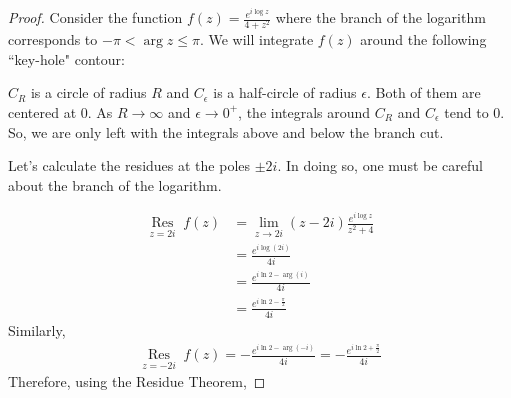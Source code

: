 \begin{proof}
Consider the function $f(z) = \frac{e^{i\log z}}{4+z^2}$ where the branch of the logarithm corresponds to $-\pi < \arg z \leq \pi$. We will integrate $f(z)$ around the following ``key-hole" contour:
\begin{figure}[H]
\centering
{}
\end{figure}
$C_R$ is a circle of radius $R$ and $C_{\epsilon}$ is a half-circle of radius $\epsilon$. Both of them are centered at $0$. As $R\to\infty$ and $\epsilon\to 0^+$, the integrals around $C_R$ and $C_\epsilon$ tend to $0$. So, we are only left with the integrals above and below the branch cut. 

Let's calculate the residues at the poles $\pm 2i$. In doing so, one must be careful about the branch of the logarithm.

\begin{align*}
\mathop{\text{Res}}\limits_{z=2i} \; f(z)&= \lim_{z\to 2i} (z-2i) \frac{e^{i\log z}}{z^2+4} \\
&= \frac{e^{i\log(2i)}}{4i} \\
&= \frac{e^{i\ln 2- \arg (i)}}{4i}\\
&= \frac{e^{i\ln 2 -\frac{\pi}{2}}}{4i}
\end{align*}
Similarly,
\begin{align*}
\mathop{\text{Res}}\limits_{z=-2i} \; f(z)=-\frac{e^{i\ln 2 -\arg(-i)}}{4i} =-\frac{e^{i\ln 2 +\frac{\pi}{2}}}{4i}
\end{align*}
Therefore, using the Residue Theorem,


\end{proof}
